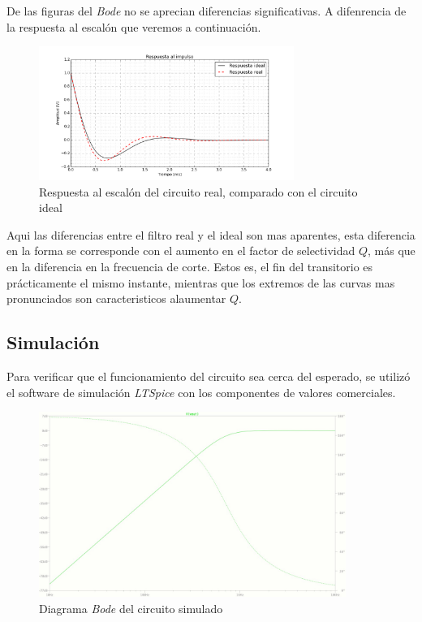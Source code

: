 De las figuras del \textit{Bode} no se aprecian diferencias significativas. A difenrencia de la respuesta al escal\'on que veremos a continuaci\'on.

\begin{figure}[hbt]
	\centering
	\includegraphics[width=8.3cm]{imagenes/StepReal}
	\caption{Respuesta al escal\'on del circuito real, comparado con el circuito ideal}	
\end{figure}
Aqui las diferencias entre el filtro real y el ideal son mas aparentes, esta diferencia en la forma se corresponde con el aumento en el factor de selectividad $Q$, m\'as que en la diferencia en la frecuencia de corte. Estos es, el fin del transitorio es pr\'acticamente el mismo instante, mientras que los extremos de las curvas mas pronunciados son caracteristicos alaumentar $Q$.
 


\subsection*{Simulaci\'on}
	Para verificar que el funcionamiento del circuito sea cerca del esperado, se utiliz\'o el software de simulaci\'on \textit{LTSpice} con los componentes de valores comerciales. 
\begin{figure}[hbt]
	\centering
	\includegraphics[width=10cm]{imagenes/BodeSimulacion}
	\caption{Diagrama \textit{Bode} del circuito simulado}
\end{figure}

